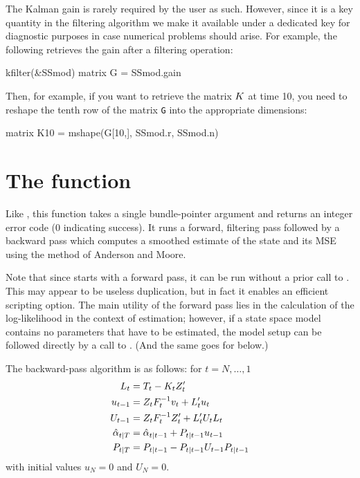 The Kalman gain is rarely required by the user as such. However, since
it is a key quantity in the filtering algorithm we make it available
under a dedicated key for diagnostic purposes in case numerical
problems should arise. For example, the following retrieves the gain
after a filtering operation:
%
\begin{code}
kfilter(&SSmod)
matrix G = SSmod.gain
\end{code}

Then, for example, if you want to retrieve the matrix $K$ at time
10, you need to reshape the tenth row of the matrix \texttt{G} into
the appropriate dimensions:
\begin{code}
matrix K10 = mshape(G[10,], SSmod.r, SSmod.n)
\end{code}

\section{The  function}
\label{sec:ksmooth}

Like , this function takes a single bundle-pointer
argument and returns an integer error code (0 indicating success).  It
runs a forward, filtering pass followed by a backward pass which
computes a smoothed estimate of the state and its MSE using the method
of Anderson and Moore.

Note that since  starts with a forward pass, it can be
run without a prior call to . This may appear to be
useless duplication, but in fact it enables an efficient scripting
option.  The main utility of the forward pass lies in the calculation
of the log-likelihood in the context of estimation; however, if a
state space model contains no parameters that have to be estimated,
the model setup can be followed directly by a call to
. (And the same goes for  below.)

The backward-pass algorithm is as follows: for $t=N,\dots,1$
%
\begin{align*}
L_t &= T_t - K_t Z_t' \\
u_{t-1} &= Z_t F_t^{-1} v_t
 + L_t' u_t \\
U_{t-1} &= Z_t F_t^{-1} Z_t' +
  L_t' U_t L_t \\
\hat{\alpha}_{t|T} &= \hat{\alpha}_{t|t-1} +
  P_{t|t-1} u_{t-1} \\
P_{t|T} &= P_{t|t-1} -
  P_{t|t-1} U_{t-1} P_{t|t-1}
\end{align*}
%
with initial values $u_N = 0$ and $U_N = 0$.


